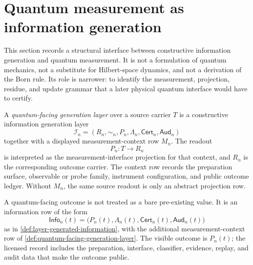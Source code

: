 \section{Quantum measurement as information generation}
\label{sec:quantum-measurement-generation-interface}

\begin{remark}
\label{rem:quantum-measurement-generation-boundary}
This section records a structural interface between constructive
information generation and quantum measurement. It is not a formulation
of quantum mechanics, not a substitute for Hilbert-space dynamics, and
not a derivation of the Born rule. Its role is narrower: to identify the
measurement, projection, residue, and update grammar that a later
physical quantum interface would have to certify.
\end{remark}

\begin{definition}
\label{def:quantum-facing-generation-layer}
A \emph{quantum-facing generation layer} over a source carrier $T$ is a
constructive information generation layer
$$
\mathcal I_n
=
(R_n,\sim_n,P_n,\Lambda_n,\mathsf{Cert}_n,\mathsf{Aud}_n)
$$
together with a displayed measurement-context row $M_n$. The readout
$$
P_n:T\to R_n
$$
is interpreted as the measurement-interface projection for that context,
and $R_n$ is the corresponding outcome carrier. The context row records
the preparation surface, observable or probe family, instrument
configuration, and public outcome ledger. Without $M_n$, the same source
readout is only an abstract projection row.
\end{definition}

\begin{principle}
\label{prin:quantum-measurement-results-licensed-records}
A quantum-facing outcome is not treated as a bare pre-existing value. It
is an information row of the form
$$
\mathsf{Info}_n(t)
=
\bigl(P_n(t),\Lambda_n(t),\mathsf{Cert}_n(t),\mathsf{Aud}_n(t)\bigr)
$$
as in \autoref{def:layer-generated-information}, with the additional
measurement-context row of
\autoref{def:quantum-facing-generation-layer}. The visible outcome is
$P_n(t)$; the licensed record includes the preparation, interface,
classifier, evidence, replay, and audit data that make the outcome
public.
\end{principle}

